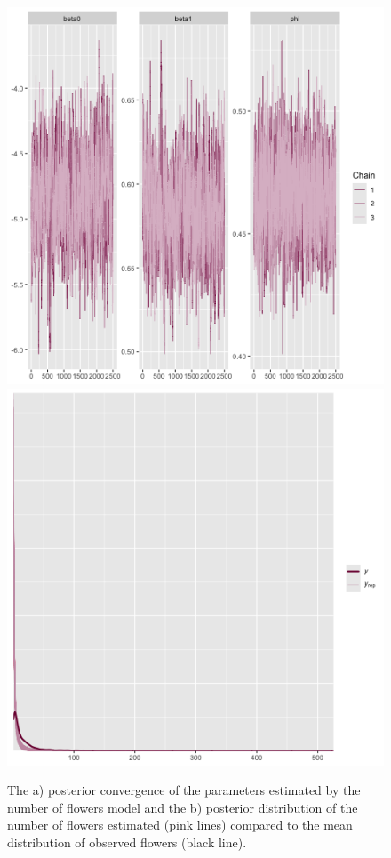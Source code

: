 \documentclass[11pt]{article}
\begin{document}
\begin{figure}
\includegraphics[width = 0.45\linewidth]{Figures/flow_conv.png}
\includegraphics[width=0.45\linewidth]{Figures/flow_post.png}
\caption{The a) posterior convergence of the parameters estimated by the number of flowers model and the b) posterior distribution of the number of flowers estimated (pink lines) compared to the mean distribution of observed flowers (black line).}
\label{fig:Flow_post}
\end{figure}
\end{document}
